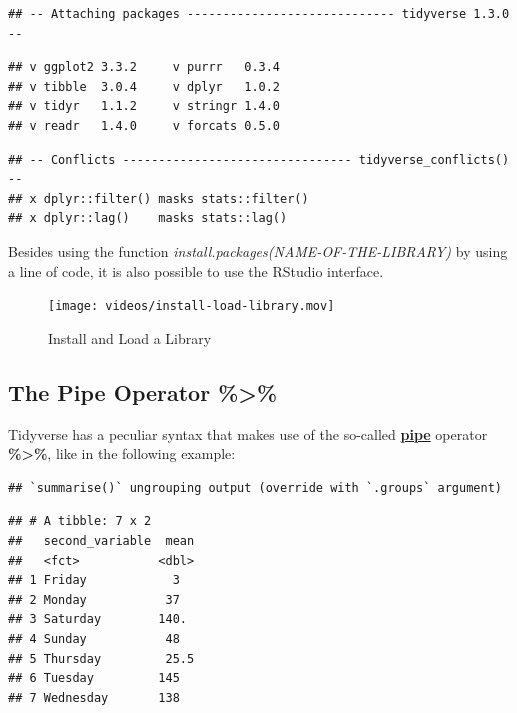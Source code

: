 \documentclass[
]{article}
\newenvironment{Shaded}{\begin{snugshade}}{\end{snugshade}}
\newcommand{\DataTypeTok}[1]{\textcolor[rgb]{0.13,0.29,0.53}{#1}}
\newcommand{\KeywordTok}[1]{\textcolor[rgb]{0.13,0.29,0.53}{\textbf{#1}}}
\newcommand{\NormalTok}[1]{#1}
\newcommand{\OperatorTok}[1]{\textcolor[rgb]{0.81,0.36,0.00}{\textbf{#1}}}
\newcommand{\StringTok}[1]{\textcolor[rgb]{0.31,0.60,0.02}{#1}}
\begin{document}
\begin{verbatim}
## -- Attaching packages ----------------------------- tidyverse 1.3.0 --
\end{verbatim}

\begin{verbatim}
## v ggplot2 3.3.2     v purrr   0.3.4
## v tibble  3.0.4     v dplyr   1.0.2
## v tidyr   1.1.2     v stringr 1.4.0
## v readr   1.4.0     v forcats 0.5.0
\end{verbatim}

\begin{verbatim}
## -- Conflicts -------------------------------- tidyverse_conflicts() --
## x dplyr::filter() masks stats::filter()
## x dplyr::lag()    masks stats::lag()
\end{verbatim}

Besides using the function \emph{install.packages(NAME-OF-THE-LIBRARY)} by using a line of code, it is also possible to use the RStudio interface.

\begin{figure}
\centering
\texttt{[image: videos/install-load-library.mov]}
\caption{Install and Load a Library}
\end{figure}

\hypertarget{the-pipe-operator}{%
\subsection{The Pipe Operator \%\textgreater\%}\label{the-pipe-operator}}

Tidyverse has a peculiar syntax that makes use of the so-called \href{https://style.tidyverse.org/pipes.html}{\textbf{pipe}} operator \textbf{\%\textgreater\%}, like in the following example:

\begin{Shaded}
\end{Shaded}

\begin{verbatim}
## `summarise()` ungrouping output (override with `.groups` argument)
\end{verbatim}

\begin{verbatim}
## # A tibble: 7 x 2
##   second_variable  mean
##   <fct>           <dbl>
## 1 Friday            3  
## 2 Monday           37  
## 3 Saturday        140. 
## 4 Sunday           48  
## 5 Thursday         25.5
## 6 Tuesday         145  
## 7 Wednesday       138
\end{verbatim}
\end{document}
